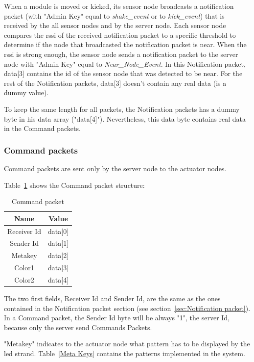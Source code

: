 When a module is moved or kicked, its sensor node broadcasts a notification packet (with "Admin Key" equal to \emph{shake\_event} or to \emph{kick\_event}) that is received by the all sensor nodes and by the server node. Each sensor node compares the rssi of the received notification packet to a specific threshold to determine if the node that broadcasted the notification packet is near. When the rssi is strong enough, the sensor node sends a notification packet to the server node with "Admin Key" equal to \emph{Near\_Node\_Event}. In this Notification packet, data[3] contains the id of the sensor node that was detected to be near. For the rest of the Notification packets, data[3] doesn't contain any real data (is a dummy value). 

To keep the same length for all packets, the Notification packets has a dummy byte in his data array ("data[4]"). Nevertheless, this data byte contains real data in the Command packets. 

\subsubsection{Command packets}
Command packets are sent only by the server node to the actuator nodes. 	

Table~\ref{Command-packet} shows the Command packet structure: 

\begin{table}[h]
  \centering
  \begin{tabular}{ c | c }
    \hline
    \textbf{Name} & \textbf{Value}\\ [0.5ex]    
    \hline
    Receiver Id & data[0] \\
    Sender Id & data[1] \\
    Metakey & data[2]\\
    Color1  & data[3]\\
    Color2 & data[4]\\ 	 
    \hline
  \end{tabular}
  \caption[Command packet]%
          {Command packet}
  \label{Command-packet}
\end{table}

The two first fields, Receiver Id and Sender Id, are the same as the ones contained in the Notification packet section (see section~\ref{sec:Notification packet}). In a Command packet, the Sender Id byte will be always "1", the server Id, because only the server send Commands Packets.

"Metakey" indicates to the actuator node what pattern has to be displayed by the led strand. Table~\ref{Meta Keys} contains the patterns implemented in the system.

